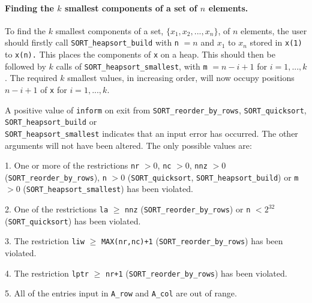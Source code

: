 \documentclass{galahad}
\newcommand{\packagename}{SORT}
\begin{document}

\paragraph{Finding the $k$ smallest components of a set of $n$ elements.}

To find the $k$ smallest components of a set,
$\{ x_1 ,   x_2 ,  ...  ,  x_n \}$, of $n$ elements, the user should firstly
call {\tt \packagename\_heapsort\_build} with {\tt n} $= n$ and $x_1 $ to
$x_n $ stored in {\tt x(1)} to {\tt x(n).} This places the components of
{\tt x} on a heap. This should then be followed by $k$ calls of
{\tt \packagename\_heapsort\_smallest}, with
{\tt m} $= n - i + 1$ for $i  =  1,  ... ,   k$.
The required $k$ smallest values, in increasing order, will now
occupy positions $n - i + 1$ of {\tt x} for $i  =  1,  ... ,   k$.


\galerrors
A positive value of {\tt inform} on exit from
{\tt \packagename\_reorder\_by\_rows},
{\tt \packagename\_quicksort},
{\tt \packagename\_heapsort\_build}
or \\
{\tt \packagename\_heapsort\_smallest}
indicates that an input error has occurred.
The other arguments will not have been altered.
The only possible values are:

\begin{description}
\item{1.} One or more of the restrictions
{\tt nr} $> 0$,
{\tt nc} $> 0$,
{\tt nnz} $> 0$
({\tt \packagename\_reorder\_by\_rows}),
{\tt n} $> 0$ ({\tt \packagename\_quicksort},
{\tt \packagename\_heapsort\_build})
or {\tt m} $> 0$ ({\tt \packagename\_heapsort\_smallest})
has been violated.
\item{2.} One of the restrictions
{\tt la} $\geq$ {\tt nnz}
({\tt \packagename\_reorder\_by\_rows})
or
{\tt n} $< 2^{32}$ ({\tt \packagename\_quicksort})
has been violated.
\item{3.} The restriction
{\tt liw} $\geq$ {\tt MAX(nr,nc)+1}
({\tt \packagename\_reorder\_by\_rows})
has been violated.
\item{4.} The restriction
{\tt lptr} $\geq$ {\tt nr+1}
({\tt \packagename\_reorder\_by\_rows})
has been violated.
\item{5.} All of the entries input in {\tt A\_row} and {\tt A\_col}
are out of range.
\end{description}
\end{document}
